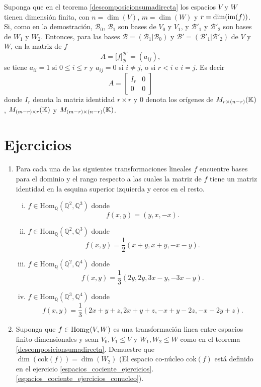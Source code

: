 \begin{obs}
Suponga que en el teorema \ref{descomposicionsumadirecta} los espacios $V$ y $W$ tienen dimensi\'on finita, con $n=\dim(V)$, $m=\dim(W)$ y $r=\dim(\operatorname{im}(f))$. Si, como en la demostración, $\mathcal{B}_0$, $\mathcal{B}_1$ son bases de $V_0$ y $V_1$, y $\mathcal{B}'_1$ y $\mathcal{B}'_2$ son bases de $W_1$ y $W_2$. Entonces, para las bases $\mathcal{B}=\left(\mathcal{B}_1|\mathcal{B}_0\right)$ y $\mathcal{B}'=\left(\mathcal{B}'_1|\mathcal{B}'_2\right)$ de $V$ y $W$, en la matriz de $f$
\[
A=\Big[f\Big]^{\mathcal{B}'}_{\mathcal{B}}=(a_{ij}),
\]
se tiene $a_{ii}=1$ si $0\le i\le r$ y $a_{ij}=0$ si $i\ne j$, o si $r<i$ e $i=j$. Es decir
\[
A=\left[\begin{array}{c|c}
I_r & 0\\
\hline
0   & 0
\end{array}\right]
\]
donde $I_r$ denota la matriz identidad $r\times r$ y $0$ denota los or\'igenes de $M_{r\times (n-r)}(\mathbb{K})$, $M_{(m-r)\times r}(\mathbb{K})$ y $M_{(m-r)\times(n-r)}(\mathbb{K})$.
\end{obs}

\section*{Ejercicios}

\begin{enumerate}
  \item Para cada una de las siguientes transformaciones lineales $f$ encuentre bases para el dominio y el rango respecto a las cuales la matriz de $f$ tiene un matriz identidad en la esquina superior izquierda y ceros en el resto.
  \begin{enumerate}[(i)]
  \item $f\in\textrm{Hom}_{\mathbb{Q}}(\mathbb{Q}^2,\mathbb{Q}^3)$ donde
  $$f(x,y)=(y,x,-x).$$
  \item $f\in\textrm{Hom}_{\mathbb{Q}}(\mathbb{Q}^2,\mathbb{Q}^3)$ donde
  $$f(x,y)=\dfrac{1}{2}(x+y,x+y,-x-y).$$
  \item $f\in\textrm{Hom}_{\mathbb{Q}}(\mathbb{Q}^2,\mathbb{Q}^4)$ donde
  $$f(x,y)=\dfrac{1}{3}(2y,2y,3x-y,-3x-y).$$
  \item $f\in\textrm{Hom}_{\mathbb{Q}}(\mathbb{Q}^3,\mathbb{Q}^4)$ donde
  $$f(x,y)=\dfrac{1}{3}(2x+y+z,2x+y+z,-x+y-2z,-x-2y+z).$$
  \end{enumerate}

  \item Suponga que $f\in\operatorname{Hom}_{\mathbb{K}}(V,W)$ es una transformación linea entre espacios finito-dimensionales y sean $V_0,V_1\le V$ y $W_1,W_2\le W$ como en el teorema \ref{descomposicionsumadirecta}. Demuestre que $\dim(\text{cok}(f))=\dim(W_2)$ (El espacio co-núcleo $\text{cok}(f)$ está definido en el ejercicio \ref{espacios_cociente_ejercicios}.\ref{espacios_cociente_ejercicios_conucleo}).
\end{enumerate}

